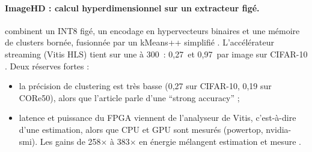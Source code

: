 \paragraph{ImageHD : calcul hyperdimensionnel sur un extracteur figé.}
\citet{arxiv-2604.21280-imagehd-energy-efficient-device-continual} combinent un 
INT8 figé, un encodage en hypervecteurs binaires et une mémoire de clusters bornée,
fusionnée par un kMeans++ simplifié . L'accélérateur streaming (Vitis HLS) tient
sur une  à 300\, : 0,27\, et 0,97\, par image sur CIFAR-10
. Deux réserves fortes :
\begin{itemize}
  \item la précision de clustering est très basse (0,27 sur CIFAR-10, 0,19 sur CORe50),
    alors que l'article parle d'une \enquote{strong accuracy}  ;
  \item latence et puissance du FPGA viennent de l'analyseur de Vitis, c'est-à-dire d'une
    estimation, alors que CPU et GPU sont mesurés (powertop, nvidia-smi). Les gains de
    258$\times$ à 383$\times$ en énergie mélangent estimation et mesure .
\end{itemize}

